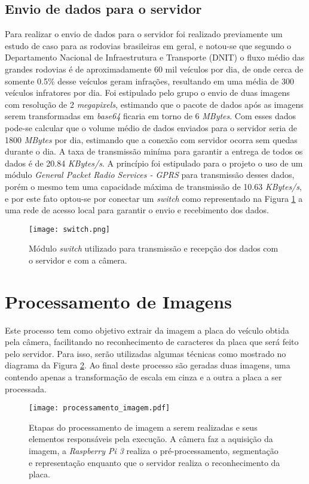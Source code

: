     \subsection{Envio de dados para o servidor}
    Para realizar o envio de dados para o servidor foi realizado previamente um estudo de caso para as rodovias brasileiras em geral, e notou-se que segundo o Departamento Nacional de Infraestrutura e Transporte (DNIT) o fluxo médio das grandes rodovias é de aproximadamente 60 mil veículos por dia, de onde cerca de somente 0.5\% desse veículos geram infrações, resultando em uma média de 300 veículos infratores por dia. Foi estipulado pelo grupo o envio de duas imagens com resolução de 2 \emph{megapixels}, estimando que o pacote de dados após as imagens serem transformadas em \emph{base64} ficaria em torno de 6 \emph{MBytes}. Com esses dados pode-se calcular que o volume médio de dados enviados para o servidor seria de 1800 \emph{MBytes} por dia, estimando que a conexão com servidor ocorra sem quedas durante o dia. A taxa de transmissão miníma para garantir a entrega de todos os dados é de 20.84 \emph{KBytes/s}. A princípio foi estipulado para o projeto o uso de um módulo \emph{General Packet Radio Services - GPRS} para transmissão desses dados, porém o mesmo tem uma capacidade máxima de transmissão de 10.63 \emph{KBytes/s}, e por este fato optou-se por conectar um \emph{switch}  como representado na Figura \ref{switch} a uma rede de acesso local para garantir o envio e recebimento dos dados. %
        \begin{figure}[H]
            \centering
            \texttt{[image: switch.png]}
            \caption{Módulo \emph{switch} utilizado para transmissão e recepção dos dados com o servidor e com a câmera.}
            \label{switch}
        \end{figure}

\section{Processamento de Imagens}

Este processo tem como objetivo extrair da imagem a placa do veículo obtida pela câmera, facilitando no reconhecimento de caracteres da placa que será feito pelo servidor. Para isso, serão utilizadas algumas técnicas como mostrado no diagrama da Figura \ref{processamento_imagem}. Ao final deste processo são geradas duas imagens, uma contendo apenas a transformação de escala em cinza e a outra a placa a ser processada.
\begin{figure}[H]
    \centering
    \texttt{[image: processamento\_imagem.pdf]}
    \caption{Etapas do processamento de imagem a serem realizadas e seus elementos responsáveis pela execução. A câmera faz a aquisição da imagem, a \emph{Raspberry Pi 3} realiza o pré-processamento, segmentação e representação enquanto que o servidor realiza o reconhecimento da placa.} 
    \label{processamento_imagem}
\end{figure}

